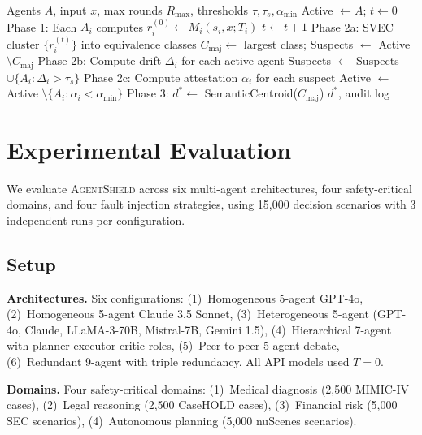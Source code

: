 \documentclass[journal,10pt]{IEEEtran}
\begin{document}
\begin{algorithm}[t]
\caption{Full \textsc{AgentShield} Protocol}
\label{alg:full}
\begin{algorithmic}[1]
\REQUIRE Agents $A$, input $x$, max rounds $R_{\max}$, thresholds $\tau, \tau_s, \alpha_{\min}$
\STATE Active $\gets A$; $t \gets 0$
\STATE Phase 1: Each $A_i$ computes $r_i^{(0)} \gets M_i(s_i, x; T_i)$
\REPEAT
    \STATE $t \gets t + 1$
    \STATE Phase 2a: SVEC cluster $\{r_i^{(t)}\}$ into equivalence classes
    \STATE $C_{\text{maj}} \gets$ largest class; Suspects $\gets$ Active $\setminus C_{\text{maj}}$
    \STATE Phase 2b: Compute drift $\Delta_i$ for each active agent
    \STATE Suspects $\gets$ Suspects $\cup \{A_i : \Delta_i > \tau_s\}$
        \STATE Phase 2c: Compute attestation $\alpha_i$ for each suspect
        \STATE Active $\gets$ Active $\setminus \{A_i : \alpha_i < \alpha_{\min}\}$
    \ENDIF
{}
\STATE Phase 3: $d^* \gets$ SemanticCentroid($C_{\text{maj}}$)
\RETURN $d^*$, audit log
\end{algorithmic}
\end{algorithm}

\section{Experimental Evaluation}\label{sec:experiments}
We evaluate \textsc{AgentShield} across six multi-agent architectures, four safety-critical domains, and four fault injection strategies, using 15{,}000 decision scenarios with 3 independent runs per configuration.

\subsection{Setup}
\textbf{Architectures.} Six configurations: (1)~Homogeneous 5-agent GPT-4o, (2)~Homogeneous 5-agent Claude 3.5 Sonnet, (3)~Heterogeneous 5-agent (GPT-4o, Claude, LLaMA-3-70B, Mistral-7B, Gemini 1.5), (4)~Hierarchical 7-agent with planner-executor-critic roles, (5)~Peer-to-peer 5-agent debate, (6)~Redundant 9-agent with triple redundancy. All API models used $T = 0$.

\textbf{Domains.} Four safety-critical domains: (1)~Medical diagnosis (2{,}500 MIMIC-IV cases), (2)~Legal reasoning (2{,}500 CaseHOLD cases), (3)~Financial risk (5{,}000 SEC scenarios), (4)~Autonomous planning (5{,}000 nuScenes scenarios).
\end{document}
